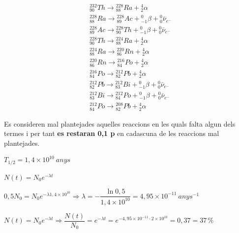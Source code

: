\begin{solapartat}
\begin{align*}
&{}^{232}_{90}Th \rightarrow {}^{228}_{88}Ra + {}^{4}_{2}\alpha\\
&{}^{228}_{88}Ra \rightarrow {}^{228}_{89}Ac + {}^{0}_{-1}\beta + {}^{0}_{0}\bar{\nu}_{e^-}\\
&{}^{228}_{89}Ac \rightarrow {}^{228}_{90}Th + {}^{0}_{-1}\beta + {}^{0}_{0}\bar{\nu}_{e^-}\\
&{}^{228}_{90}Th \rightarrow {}^{224}_{88}Ra + {}^{4}_{2}\alpha\\
&{}^{224}_{88}Ra \rightarrow {}^{220}_{86}Rn + {}^{4}_{2}\alpha\\
&{}^{220}_{86}Rn \rightarrow {}^{216}_{84}Po + {}^{4}_{2}\alpha\\
&{}^{216}_{84}Po \rightarrow {}^{212}_{82}Pb + {}^{4}_{2}\alpha\\
&{}^{212}_{82}Pb \rightarrow {}^{212}_{83}Bi + {}^{0}_{-1}\beta + {}^{0}_{0}\bar{\nu}_{e^-}\\
&{}^{212}_{83}Bi \rightarrow {}^{212}_{84}Po + {}^{0}_{-1}\beta + {}^{0}_{0}\bar{\nu}_{e^-}\\
&{}^{212}_{84}Po \rightarrow {}^{208}_{82}Pb + {}^{4}_{2}\alpha
\end{align*}

Es consideren mal plantejades aquelles reaccions en les quals falta algun dels termes i per tant \textcolor{red!70!black}{\textbf{es restaran 0,1 p}} en cadascuna de les reaccions mal plantejades.
\end{solapartat}

\begin{solapartat}
$T_{1/2} = 1,4\times 10^{10}\ anys$

 $N(t) = N_0e^{-\lambda t}$

 $0,5N_0 = N_0e^{-\lambda 1,4\times 10^{10}} \Rightarrow \lambda = -\dfrac{\ln 0,5}{1,4\times 10^{10}} = 4,95\times 10^{-11}\ anys^{-1}$

 $N(t) = N_0e^{-\lambda t} \Rightarrow \dfrac{N(t)}{N_0} = e^{-\lambda t} = e^{-4,95\times 10^{-11}\cdot 2\times 10^{10}} = 0,37 = 37\,\%$
\end{solapartat}
